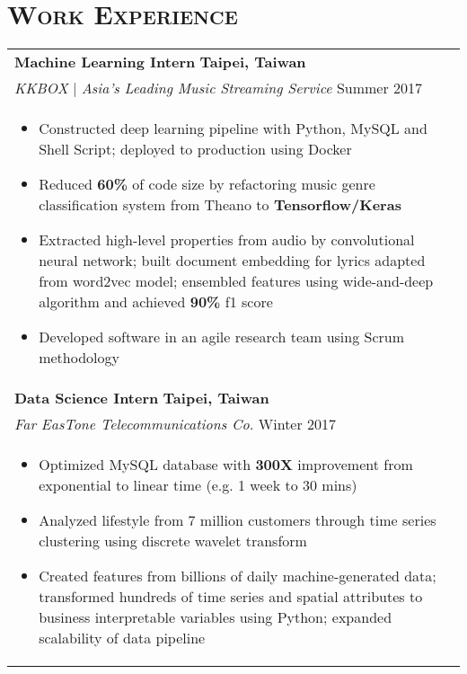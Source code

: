 \documentclass[letterpaper,11pt]{article} %
\begin{document}
{\section{\Large\bf\textsc{Work Experience}}
\begin{tabular}{p{18.5cm}}

{\bf{Machine Learning Intern}} \hfill \bf{Taipei, Taiwan}\\
{\it KKBOX} | {\it Asia's Leading Music Streaming Service } \hfill  Summer 2017\\%
\begin{itemize}
\vspace{-3mm}
\item Constructed deep learning pipeline with Python, MySQL and Shell Script; deployed to production using Docker
\item Reduced {\bf 60\%} of code size by refactoring music genre classification system from Theano to {\bf Tensorflow/Keras} 
\item Extracted high-level properties from audio by convolutional neural network; built document embedding for lyrics adapted from word2vec model; ensembled features using wide-and-deep algorithm and achieved {\bf 90\%} f1 score 
\item Developed software in an agile research team using Scrum methodology \vspace*{-\baselineskip}
\end{itemize} \\ 
\vspace{.1mm}

{\bf{Data Science Intern}} \hfill \bf{Taipei, Taiwan}\\
{\it Far EasTone Telecommunications Co.} \hfill  Winter 2017\\%
\begin{itemize}
\vspace{-3mm}
\item Optimized MySQL database with {\bf300X} improvement from exponential to linear time (e.g. 1 week to 30 mins) 
\item Analyzed lifestyle from 7 million customers through time series clustering using discrete wavelet transform
\item Created features from billions of daily machine-generated data; transformed hundreds of time series and spatial attributes to business interpretable variables using Python; expanded scalability of data pipeline \vspace*{-\baselineskip}
\end{itemize} 
\vspace{.1mm}
\end{tabular}

}
\end{document}
